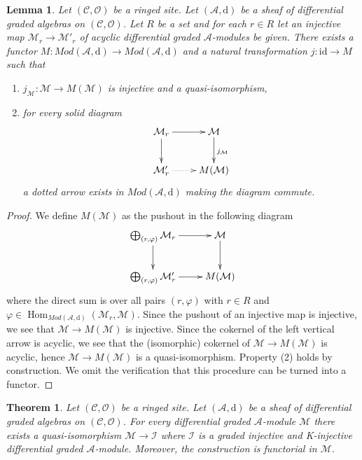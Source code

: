 \documentclass{stacks-project}
\theoremstyle{plain}
\newtheorem{theorem}[subsection]{Theorem}
\newtheorem{lemma}[subsection]{Lemma}
\theoremstyle{definition}
\theoremstyle{remark}
\numberwithin{equation}{subsection}
\def\Hom{\mathop{\mathrm{Hom}}\nolimits}
\begin{document}
\begin{lemma}
\label{lemma-functor-set-of-monos}
Let $(\mathcal{C}, \mathcal{O})$ be a ringed site.
Let $(\mathcal{A}, \text{d})$
be a sheaf of differential graded algebras on $(\mathcal{C}, \mathcal{O})$.
Let $R$ be a set and for each $r \in R$ let an injective map
$\mathcal{M}_r \to \mathcal{M}'_r$ of
acyclic differential graded $\mathcal{A}$-modules be given.
There exists a functor $M : \textit{Mod}(\mathcal{A}, \text{d}) \to
\textit{Mod}(\mathcal{A}, \text{d})$ and a natural transformation
$j : \text{id} \to M$ such that
\begin{enumerate}
\item $j_\mathcal{M} : \mathcal{M} \to M(\mathcal{M})$ is injective
and a quasi-isomorphism,
\item for every solid diagram
$$
\xymatrix{
\mathcal{M}_r \ar[r] \ar[d] & \mathcal{M} \ar[d]^{j_\mathcal{M}} \\
\mathcal{M}'_r \ar@{..>}[r] & M(\mathcal{M})
}
$$
a dotted arrow exists in $\textit{Mod}(\mathcal{A}, \text{d})$
making the diagram commute.
\end{enumerate}
\end{lemma}

\begin{proof}
We define $M(\mathcal{M})$ as the pushout in the following diagram
$$
\xymatrix{
\bigoplus_{(r, \varphi)} \mathcal{M}_r \ar[r] \ar[d] &
\mathcal{M} \ar[d] \\
\bigoplus_{(r, \varphi)} \mathcal{M}'_r \ar[r] &
M(\mathcal{M})
}
$$
where the direct sum is over all pairs $(r, \varphi)$
with $r \in R$ and $\varphi \in
\Hom_{\textit{Mod}(\mathcal{A}, \text{d})}(\mathcal{M}_r, \mathcal{M})$.
Since the pushout of an injective map is injective, we see that
$\mathcal{M} \to M(\mathcal{M})$ is injective.
Since the cokernel of the left vertical arrow is acyclic,
we see that the (isomorphic) cokernel of $\mathcal{M} \to M(\mathcal{M})$
is acyclic, hence $\mathcal{M} \to M(\mathcal{M})$
is a quasi-isomorphism. Property (2) holds by construction.
We omit the verification that
this procedure can be turned into a functor.
\end{proof}

\begin{theorem}
\label{theorem-qis-into-dg-injective}
Let $(\mathcal{C}, \mathcal{O})$ be a ringed site.
Let $(\mathcal{A}, \text{d})$
be a sheaf of differential graded algebras on $(\mathcal{C}, \mathcal{O})$.
For every differential graded $\mathcal{A}$-module $\mathcal{M}$ there
exists a quasi-isomorphism $\mathcal{M} \to \mathcal{I}$
where $\mathcal{I}$ is a graded injective and K-injective
differential graded $\mathcal{A}$-module. Moreover, the
construction is functorial in $\mathcal{M}$.
\end{theorem}
\end{document}
